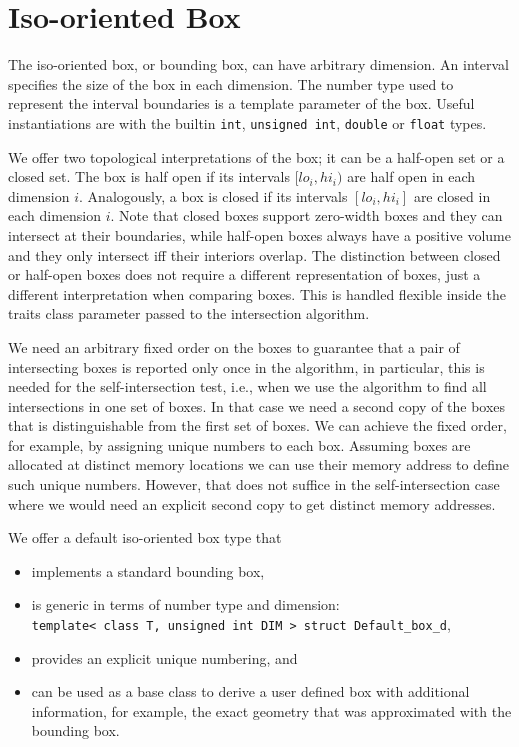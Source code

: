 \section{Iso-oriented Box}

The iso-oriented box, or bounding box, can have arbitrary dimension.
An interval specifies the size of the box in each dimension. The
number type used to represent the interval boundaries is a template
parameter of the box. Useful instantiations are with the builtin
\texttt{int}, \texttt{unsigned int}, \texttt{double} or \texttt{float}
types.

We offer two topological interpretations of the box; it can be a
half-open set or a closed set. The box is half open if its intervals
$[lo_i,hi_i)$ are half open in each dimension $i$. Analogously, a box
is closed if its intervals $[lo_i,hi_i]$ are closed in each dimension
$i$. Note that closed boxes support zero-width boxes and they can
intersect at their boundaries, while half-open boxes always have a
positive volume and they only intersect iff their interiors overlap.
The distinction between closed or half-open boxes does not require a
different representation of boxes, just a different interpretation
when comparing boxes. This is handled flexible inside the traits class
parameter passed to the intersection algorithm.

We need an arbitrary fixed order on the boxes to guarantee that a pair
of intersecting boxes is reported only once in the algorithm, in
particular, this is needed for the self-intersection test, i.e., when
we use the algorithm to find all intersections in one set of boxes. In
that case we need a second copy of the boxes that is distinguishable
from the first set of boxes. We can achieve the fixed order, for
example, by assigning unique numbers to each box. Assuming boxes are
allocated at distinct memory locations we can use their memory address
to define such unique numbers. However, that does not suffice in the
self-intersection case where we would need an explicit second copy to
get distinct memory addresses.

We offer a default iso-oriented box type that
\begin{itemize}
  \item implements a standard bounding box,
  \item is generic in terms of number type and dimension: \\
  \texttt{template< class T, unsigned int DIM > struct Default\_box\_d},
  \item provides an explicit unique numbering, and
  \item can be used as a base class to derive a user defined box with
  additional information, for example, the exact geometry
  that was approximated with the bounding box.
\end{itemize}

